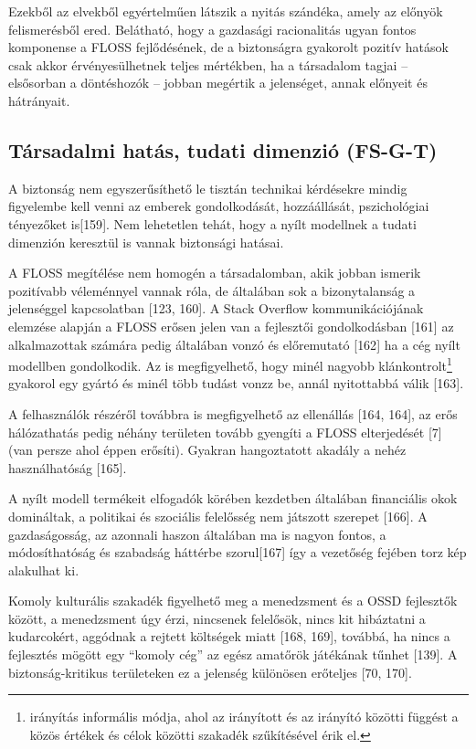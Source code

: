\documentclass[12pt,magyar,a4paper,oneside]{scrreprt}
\begin{document}
Ezekből az elvekből egyértelműen látszik a nyitás szándéka, amely az
előnyök felismerésből ered. Belátható, hogy a gazdasági racionalitás
ugyan fontos komponense a FLOSS fejlődésének, de a biztonságra gyakorolt
pozitív hatások csak akkor érvényesülhetnek teljes mértékben, ha a
társadalom tagjai -- elsősorban a döntéshozók -- jobban megértik a
jelenséget, annak előnyeit és hátrányait.

\hypertarget{sec:FS-G-T}{%
\subsection{Társadalmi hatás, tudati dimenzió
(FS-G-T)}\label{sec:FS-G-T}}

A biztonság nem egyszerűsíthető le tisztán technikai kérdésekre mindig
figyelembe kell venni az emberek gondolkodását, hozzáállását,
pszichológiai tényezőket is{[}159{]}. Nem lehetetlen tehát, hogy a nyílt
modellnek a tudati dimenzión keresztül is vannak biztonsági hatásai.

A FLOSS megítélése nem homogén a társadalomban, akik jobban ismerik
pozitívabb véleménnyel vannak róla, de általában sok a bizonytalanság a
jelenséggel kapcsolatban {[}123, 160{]}. A Stack Overflow
kommunikációjának elemzése alapján a FLOSS erősen jelen van a fejlesztői
gondolkodásban {[}161{]} az alkalmazottak számára pedig általában vonzó
és előremutató {[}162{]} ha a cég nyílt modellben gondolkodik. Az is
megfigyelhető, hogy minél nagyobb klánkontrolt\footnote{irányítás
  informális módja, ahol az irányított és az irányító közötti függést a
  közös értékek és célok közötti szakadék szűkítésével érik el.}
gyakorol egy gyártó és minél több tudást vonzz be, annál nyitottabbá
válik {[}163{]}.

A felhasználók részéről továbbra is megfigyelhető az ellenállás {[}164,
164{]}, az erős hálózathatás pedig néhány területen tovább gyengíti a
FLOSS elterjedését {[}7{]} (van persze ahol éppen erősíti). Gyakran
hangoztatott akadály a nehéz használhatóság {[}165{]}.

A nyílt modell termékeit elfogadók körében kezdetben általában
financiális okok domináltak, a politikai és szociális felelősség nem
játszott szerepet {[}166{]}. A gazdaságosság, az azonnali haszon
általában ma is nagyon fontos, a módosíthatóság és szabadság háttérbe
szorul{[}167{]} így a vezetőség fejében torz kép alakulhat ki.

Komoly kulturális szakadék figyelhető meg a menedzsment és a OSSD
fejlesztők között, a menedzsment úgy érzi, nincsenek felelősök, nincs
kit hibáztatni a kudarcokért, aggódnak a rejtett költségek miatt {[}168,
169{]}, továbbá, ha nincs a fejlesztés mögött egy ``komoly cég'' az
egész amatőrök játékának tűnhet {[}139{]}. A biztonság-kritikus
területeken ez a jelenség különösen erőteljes {[}70, 170{]}.
\end{document}

